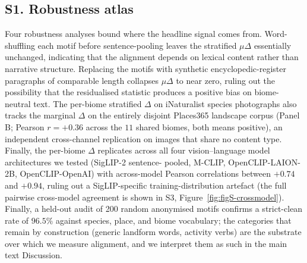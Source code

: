 \documentclass[11pt,a4paper]{article}
\begin{document}
\subsection*{S1. Robustness atlas}

Four robustness analyses bound where the headline signal comes
from. Word-shuffling each motif before sentence-pooling leaves
the stratified $\mu\Delta$ essentially unchanged, indicating that
the alignment depends on lexical content rather than narrative
structure. Replacing the motifs with synthetic
encyclopedic-register paragraphs of comparable length collapses
$\mu\Delta$ to near zero, ruling out the possibility that the
residualised statistic produces a positive bias on biome-neutral
text. The per-biome stratified $\Delta$ on iNaturalist species
photographs also tracks the marginal $\Delta$ on the entirely
disjoint Places365 landscape corpus (Panel B; Pearson $r = +0.36$
across the $11$ shared biomes, both means positive), an independent
cross-channel replication on images that share no content type.
Finally, the per-biome $\Delta$ replicates across all four
vision--language model architectures we tested (SigLIP-2 sentence-
pooled, M-CLIP, OpenCLIP-LAION-2B, OpenCLIP-OpenAI) with
across-model Pearson correlations between $+0.74$ and $+0.94$,
ruling out a SigLIP-specific training-distribution artefact (the
full pairwise cross-model agreement is shown in S3,
Figure~\ref{fig:figS-crossmodel}).
Finally, a held-out audit of 200 random anonymised motifs
confirms a strict-clean rate of $96.5\%$ against species, place,
and biome vocabulary; the categories that remain by construction
(generic landform words, activity verbs) are the substrate over
which we measure alignment, and we interpret them as such in the
main text Discussion.
\end{document}

